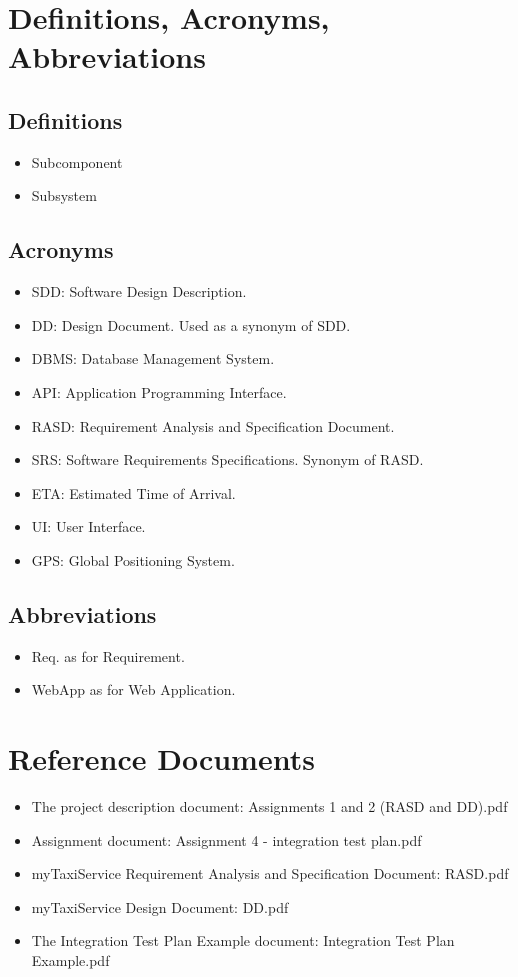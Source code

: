 \section{Definitions, Acronyms, Abbreviations}
\subsection{Definitions}
\begin{itemize}
	\item Subcomponent
	\item Subsystem
\end{itemize}
\subsection{Acronyms}
\begin{itemize}
	\item SDD: Software Design Description.
	\item DD: Design Document. Used as a synonym of SDD.
	\item DBMS: Database Management System.
	\item API: Application Programming Interface.
	\item RASD: Requirement Analysis and Specification Document.
	\item SRS: Software Requirements Specifications. Synonym of RASD.
	\item ETA: Estimated Time of Arrival.
	\item UI: User Interface.
	\item GPS: Global Positioning System.
\end{itemize}
\subsection{Abbreviations}
\begin{itemize}
	\item Req. as for Requirement.
	\item WebApp as for Web Application.
\end{itemize}
\section{Reference Documents}
\begin{itemize}
	\item The project description document: Assignments 1 and 2 (RASD and DD).pdf
	\item Assignment document: Assignment 4 - integration test plan.pdf
	\item myTaxiService Requirement Analysis and Specification Document: RASD.pdf
	\item myTaxiService Design Document: DD.pdf
	\item The Integration Test Plan Example document: Integration Test Plan Example.pdf
\end{itemize} 